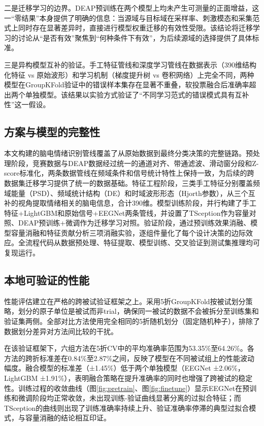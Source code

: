 \documentclass[UTF8,zihao=-4,fontset=windows]{ctexart}
\numberwithin{equation}{section}
\numberwithin{figure}{section}
\numberwithin{table}{section}
\begin{document}
二是迁移学习的边界。DEAP预训练在两个模型上均未产生可测量的正面增益，这一“零结果”本身提供了明确的信息：当源域与目标域在采样率、刺激模态和采集范式上同时存在显著差异时，直接进行模型权重迁移的有效性受限。该结论将迁移学习的讨论从“是否有效”聚焦到“何种条件下有效”，为后续源域的选择提供了具体标准。

三是异构模型互补的验证。手工特征管线和深度学习管线在数据表示（390维结构化特征 vs 原始波形）和学习机制（梯度提升树 vs 卷积网络）上完全不同，两种模型在GroupKFold验证中的错误样本集存在显著不重叠，软投票融合后准确率超出两个单独模型。该结果以实验方式验证了“不同学习范式的错误模式具有互补性”这一假设。

\subsection{方案与模型的完整性}

本文构建的脑电情绪识别管线覆盖了从原始数据到最终分类决策的完整链路。预处理阶段，竞赛数据与DEAP数据经过统一的通道对齐、带通滤波、滑动窗分段和Z-score标准化，两条数据管线在频域条件和信号统计特性上保持一致，为后续的跨数据集迁移学习提供了统一的数据基础。特征工程阶段，三类手工特征分别覆盖频域能量（PSD）、频域统计结构（DE）和时域波形形态（Hjorth参数），从三个互补的视角提取情绪相关的脑电信息，合计390维。模型训练阶段，并行构建了手工特征+LightGBM和原始信号+EEGNet两条管线，并设置了TSception作为容量对照、DEAP预训练+微调作为迁移学习对照。验证阶段，通过预训练效果消融、模型容量消融和特征贡献分析三项消融实验，逐组件量化了每个设计决策的边际效应。全流程代码从数据预处理、特征提取、模型训练、交叉验证到测试集推理均可复现运行。

\subsection{本地可验证的性能}

性能评估建立在严格的跨被试验证框架之上。采用5折GroupKFold按被试划分策略，划分的原子单位是被试而非trial，确保同一被试的数据不会被拆分至训练集和验证集两侧。全部对比方法使用完全相同的5折随机划分（固定随机种子），排除了数据划分差异对方法间比较的干扰。

在该验证框架下，六组方法在5折CV中的平均准确率范围为53.35\%至64.26\%。各方法的跨折标准差在0.84\%至2.87\%之间，反映了模型在不同被试组上的性能波动幅度。融合模型的标准差（±1.45\%）低于两个单独模型（EEGNet ±2.06\%，LightGBM ±1.91\%），表明融合策略在提升准确率的同时也增强了跨被试的稳定性。训练过程的收敛曲线（图\ref{fig:pretrain}、图\ref{fig:finetune}）显示EEGNet在预训练和微调阶段均正常收敛，未出现训练-验证曲线显著分离的过拟合特征；而TSception的曲线则出现了训练准确率持续上升、验证准确率停滞的典型过拟合模式，与容量消融的结论相互印证。
\end{document}
